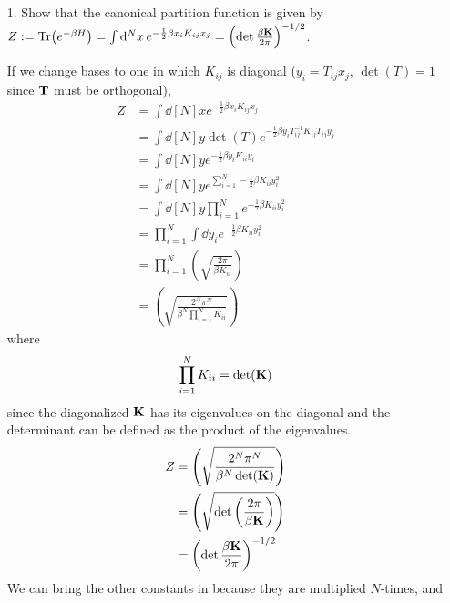 \documentclass[a4paper,twoside]{article}
\begin{document}
\begin{itemize}
    \item[1.] Show that the canonical partition function is given by $ Z:= \Tr(e^{- \beta H}) = \int \dd[N]{x} e^{- \frac{1}{2}\beta x_i K_{ij} x_j} = \left( \det \frac{\beta \vb{K}}{2 \pi} \right)^{-1/2} $.
        \begin{problem}
            If we change bases to one in which $ K_{ij} $ is diagonal ($ y_i = T_{ij} x_j $, $ \det(T) = 1 $ since $ \vb{T} $ must be orthogonal),
            \begin{align}
                Z &= \int \dd[N]{x} e^{- \frac{1}{2} \beta x_i K_{ij} x_j} \\
                &= \int \dd[N]{y} \det(T) e^{- \frac{1}{2} \beta y_i T_{ij}^{-1} K_{ij} T_{ij} y_j} \\
                &= \int \dd[N]{y} e^{- \frac{1}{2} \beta y_i K_{ii} y_i} \\
                &= \int \dd[N]{y} e^{\sum_{i=1}^{N} - \frac{1}{2} \beta K_{ii} y_i^2} \\
                &= \int \dd[N]{y} \prod_{i=1}^{N} e^{- \frac{1}{2} \beta K_{ii} y_i^2} \\
                &= \prod_{i=1}^{N} \int \dd{y_i} e^{- \frac{1}{2} \beta K_{ii} y_i^2} \\
                &= \prod_{i=1}^{N} \left( \sqrt{\frac{2\pi}{\beta K_{ii}}} \right) \\
                &= \left( \sqrt{\frac{2^N \pi^N}{\beta^N \prod_{i=1}^{N} K_{ii}}} \right)
            \end{align}
            where
            \begin{equation}
                \prod_{i=1}^{N} K_{ii} = \det(\vb{K})
            \end{equation}
            since the diagonalized $ \vb{K} $ has its eigenvalues on the diagonal and the determinant can be defined as the product of the eigenvalues.
            \begin{align}
                Z &= \left( \sqrt{\frac{2^N \pi^N}{\beta^N \det(\vb{K})}} \right) \\
                &= \left( \sqrt{\det\left( \frac{2 \pi}{\beta \vb{K}} \right)} \right) \\
                &= \left(\det \frac{\beta \vb{K}}{2 \pi} \right)^{-1/2}
            \end{align}
            We can bring the other constants in because they are multiplied $ N $-times, and
            \begin{equation}

\end{equation}
\end{problem}
\end{itemize}
\end{document}
